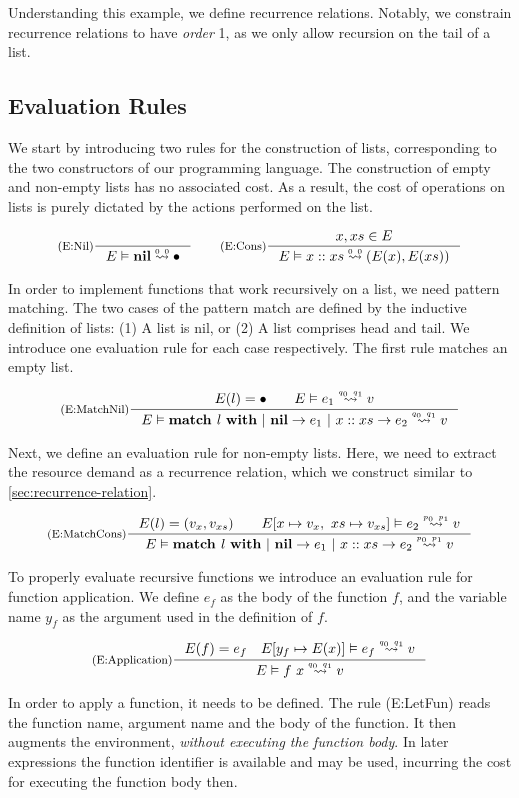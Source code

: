 Understanding this example, we define recurrence relations. Notably, we constrain recurrence relations to have \emph{order} 1, as we only allow recursion on the tail of a list. 


\subsection{Evaluation Rules}

We start by introducing two rules for the construction of lists, corresponding to the two constructors of our programming language. The construction of empty and non-empty lists has no associated cost. As a result, the cost of operations on lists is purely dictated by the actions performed on the list. 

\[
   \inference[(E:Nil)]
   {}
   {\evals{E}{\listnil}{\bullet}{0}{0}}
   \qquad
   \inference[(E:Cons)]
   {\contains{E}{x, xs}}
   {\evals{E}{\cons{x}{xs}}{(E(x), E(xs))}{0}{0}}
\]

In order to implement functions that work recursively on a list, we need pattern matching. The two cases of the pattern match are defined by the inductive definition of lists: (1) A list is nil, or (2) A list comprises head and tail. We introduce one evaluation rule for each case respectively. The first rule matches an empty list.

\[
   \inference[(E:MatchNil)]
   {E(l) = \bullet \qquad \evals{E}{e_1}{v}{q_0}{q_1}}
   {\evals{E}{\listmatch{l}{e_1}{e_2}}{v}{q_0}{q_1}}
\]

Next, we define an evaluation rule for non-empty lists. Here, we need to extract the resource demand as a recurrence relation, which we construct similar to \cref{sec:recurrence-relation}.

\[
   \inference[(E:MatchCons)]
   {E(l) = (v_x, v_{xs}) \qquad \evals{E[x \mapsto v_x,~xs \mapsto v_{xs}]}{e_2}{v}{p_0}{p_1}} 
   {\evals{E}{\listmatch{l}{e_1}{e_2}}{v}{p_0}{p_1}}
\]

To properly evaluate recursive functions we introduce an evaluation rule for function application. We define \(e_f\) as the body of the function \(f\), and the variable name \(y_f\) as the argument used in the definition of \(f\). 

\[
   \inference[(E:Application)]
   {E(f) = e_f 
   \quad 
   \evals{E[y_f \mapsto E(x)]}{e_f}{v}{q_0}{q_1}}
   {\evals{E}{f~x}{v}{q_0}{q_1}}
\]

In order to apply a function, it needs to be defined. The rule (E:LetFun) reads the function name, argument name and the body of the function. It then augments the environment, \emph{without executing the function body}. In later expressions the function identifier is available and may be used, incurring the cost for executing the function body then.

